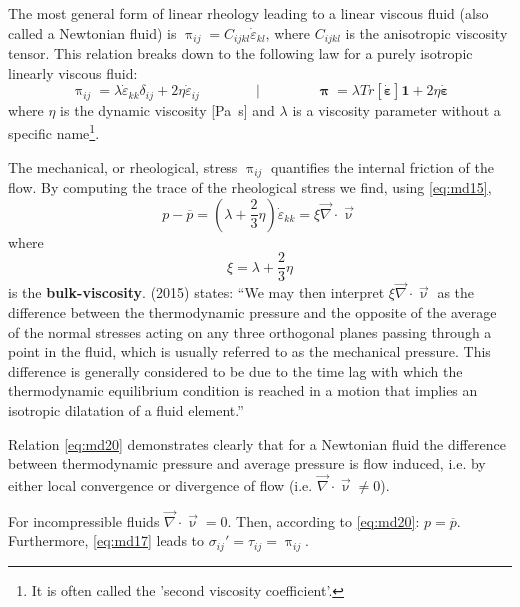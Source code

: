 The most general form of linear rheology leading to a linear viscous
fluid (also called a Newtonian fluid) is $\uppi_{ij}=C_{ijkl} \dot{\varepsilon}_{kl}$, 
where $C_{ijkl}$ is the anisotropic viscosity tensor. 
This relation breaks down to the following law for a purely isotropic
linearly viscous fluid:
\begin{equation}
\uppi_{ij} = \lambda \dot{\varepsilon}_{kk} \delta_{ij} + 2 \eta  \dot{\varepsilon}_{ij}
\qquad
\qquad
\bigg\rvert
\qquad
\qquad
{\bm \uppi} = \lambda Tr[\dot{\bm \varepsilon}] {\bm 1} + 2 \eta  \dot{\bm\varepsilon}
\label{eq:md19}
\end{equation}
where $\eta$ is the dynamic viscosity [\si{\pascal\second}] and $\lambda$ is a viscosity
parameter without a specific name\footnote{It is often called the 'second viscosity coefficient'.}.

The mechanical, or rheological, stress $\uppi_{ij}$ quantifies the internal friction of the flow. By
computing the trace of the rheological stress we find, using \eqref{eq:md15},
\begin{equation}
p - \overline{p} = \left(\lambda + \frac23 \eta \right) \dot{\varepsilon}_{kk} 
= \xi \vec\nabla\cdot\vec\upnu
\label{eq:md20}
\end{equation}
where 
\[
\xi=\lambda + \frac23 \eta
\]
is the {\bf bulk-viscosity}.
\textcite{bure15} (2015) states: ``We may then interpret $\xi \vec\nabla\cdot\vec\upnu$ 
as the difference between the thermodynamic pressure and the opposite of the average of 
the normal stresses acting on any three orthogonal
planes passing through a point in the fluid, which is usually referred to as the mechanical pressure.
This difference is generally considered to be due to the time lag with which the thermodynamic 
equilibrium condition is reached in a motion that implies an isotropic dilatation of a fluid element.''

Relation \eqref{eq:md20} demonstrates clearly that for a Newtonian fluid the difference between
thermodynamic pressure and average pressure is flow induced, i.e. by either local
convergence or divergence of flow (i.e. $\vec\nabla\cdot \vec\upnu \neq 0$).

\begin{remark}
For incompressible fluids $\vec\nabla\cdot \vec\upnu = 0$. 
Then, according to \eqref{eq:md20}: $p = \overline{p}$. Furthermore, \eqref{eq:md17}
leads to $\sigma_{ij}'=\tau_{ij}=\uppi_{ij}$.
\end{remark}

